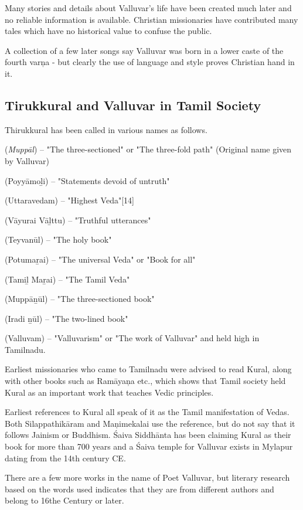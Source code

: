 Many stories and details about Valluvar’s life have been created much later and no reliable information is available. Christian missionaries\endnote{} have contributed many tales which have no historical value to confuse the public.

A collection of a few later songs say Valluvar was born in a lower caste of the fourth varņa - but clearly the use of language and style proves Christian\endnote{} hand in it.

\subsection*{Tirukkural and Valluvar in Tamil Society}

Thirukkural has been called in various names as follows.

 (\textit{Muppāl}) – "The three-sectioned" or "The three-fold path" (Original name given by Valluvar)

 (Poyyāmoḻi) – "Statements devoid of untruth"

 (Uttaravedam) – "Highest Veda"[14]

 (Vāyurai Vāḻttu) – "Truthful utterances"

 (Teyvanūl) – "The holy book"

 (Potumaṟai) – "The universal Veda" or "Book for all"

 (Tamiḻ Maṟai) – "The Tamil Veda"

 (Muppāṉūl) – "The three-sectioned book"

 (Iradi ṉūl) – "The two-lined book"

 (Valluvam) – "Valluvarism" or "The work of Valluvar" and held high in Tamilnadu.

Earliest missionaries who came to Tamilnadu were advised to read Kural, along with other books such as Ramāyaņa etc., which shows that Tamil society held Kural as an important work that teaches Vedic principles.

Earliest references to Kural all speak of it as the Tamil manifestation of Vedas. Both Silappathikāram and Maņimekalai use the reference, but do not say that it follows Jainism or Buddhism. Śaiva Siddhānta has been claiming Kural as their book for more than 700 years and a Śaiva temple for Valluvar exists in Mylapur\endnote{} dating from the 14th century CE.

There are a few more works in the name of Poet Valluvar, but literary research based on the words used indicates that they are from different authors\endnote{} and belong to 16the Century or later.


